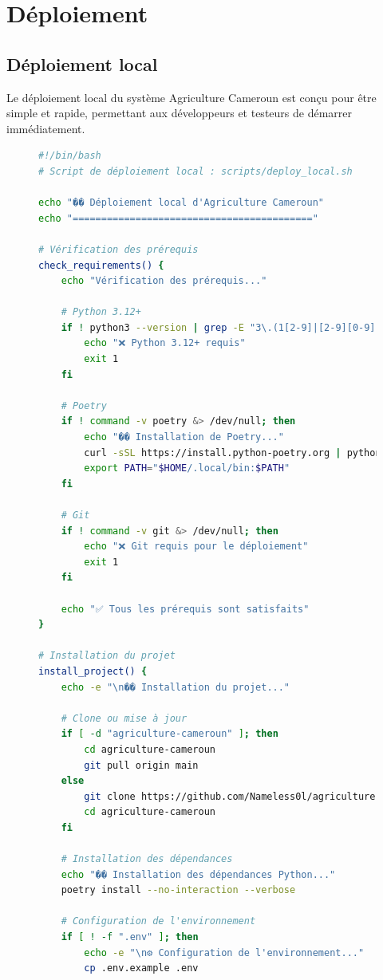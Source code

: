 \section{Déploiement}

\subsection{Déploiement local}

Le déploiement local du système Agriculture Cameroun est conçu pour être simple et rapide, permettant aux développeurs et testeurs de démarrer immédiatement.

\begin{figure}[H]
\centering
\begin{lstlisting}[language=bash, caption=Script de déploiement local automatisé]
#!/bin/bash
# Script de déploiement local : scripts/deploy_local.sh

echo "�� Déploiement local d'Agriculture Cameroun"
echo "=========================================="

# Vérification des prérequis
check_requirements() {
    echo "Vérification des prérequis..."

    # Python 3.12+
    if ! python3 --version | grep -E "3\.(1[2-9]|[2-9][0-9])" > /dev/null; then
        echo "❌ Python 3.12+ requis"
        exit 1
    fi

    # Poetry
    if ! command -v poetry &> /dev/null; then
        echo "�� Installation de Poetry..."
        curl -sSL https://install.python-poetry.org | python3 -
        export PATH="$HOME/.local/bin:$PATH"
    fi

    # Git
    if ! command -v git &> /dev/null; then
        echo "❌ Git requis pour le déploiement"
        exit 1
    fi

    echo "✅ Tous les prérequis sont satisfaits"
}

# Installation du projet
install_project() {
    echo -e "\n�� Installation du projet..."

    # Clone ou mise à jour
    if [ -d "agriculture-cameroun" ]; then
        cd agriculture-cameroun
        git pull origin main
    else
        git clone https://github.com/Nameless0l/agriculture-cameroun.git
        cd agriculture-cameroun
    fi

    # Installation des dépendances
    echo "�� Installation des dépendances Python..."
    poetry install --no-interaction --verbose

    # Configuration de l'environnement
    if [ ! -f ".env" ]; then
        echo -e "\n⚙️ Configuration de l'environnement..."
        cp .env.example .env


\end{lstlisting}
\end{figure}
